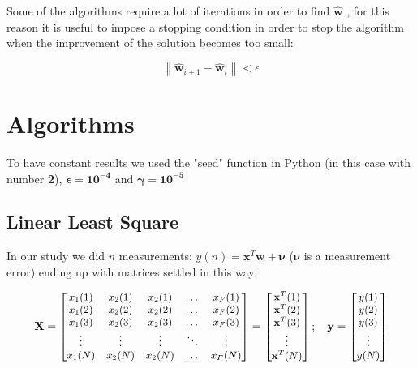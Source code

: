 \documentclass[12pt]{report}
\renewcommand{\vec}{\mathbf}
\renewcommand{\vec}{\mathbf}
\begin{document}
Some of the algorithms require a lot of iterations in order to find $\hat { \mathbf { w } }$ , for this reason it is useful to impose a stopping condition in order to stop the algorithm when the improvement of the solution becomes too small:

\begin{equation}
\left\| \hat { \mathbf { w } } _ { i + 1 } - \hat { \mathbf { w } } _ { i } \right\| < \epsilon
\end{equation}



\chapter{Algorithms}
To have constant results we used the "seed" function in Python (in this case with number \textbf{2}), $\mathbf{\epsilon=10^{-4}}$ and $ \mathbf{\gamma=10^{-5}}$
\section{Linear Least Square}
In our study we did $n$ measurements:
$y ( n ) = \mathbf { x } ^ { T } \mathbf { w } + \boldsymbol{ \nu}$ ($\boldsymbol{ \nu}$ is a measurement error) ending up with matrices settled in this way:
\begin{tiny}
\begin{equation}
\small
\vec{X}=
\begin{bmatrix}
x_1(1) & x_2(1) & x_2(1) & \dots & x_F(1) \\
x_1(2) & x_2(2) & x_2(2) & \dots & x_F(2)\\
x_1(3) & x_2(3) & x_2(3) & \dots & x_F(3) \\
\vdots & \vdots & \vdots & \ddots & \vdots \\
x_1(N) & x_2(N) & x_2(N) & \dots & x_F(N)
\end{bmatrix}
=
\begin{bmatrix}
\vec{x}^T(1) \\
\vec{x}^T(2) \\
\vec{x}^T(3) \\
\vdots \\
\vec{x}^T(N) \\
\end{bmatrix}
;\quad
\vec{y}=
\begin{bmatrix}
y(1) \\
y(2) \\
y(3) \\
\vdots \\
y(N) \\
\end{bmatrix}
\end{equation}
\end{tiny}
\end{document}
